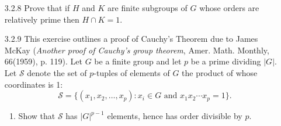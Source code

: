 \begin{enumerate}
   \item[3.2.8]   Prove that if $H$ and $K$ are finite subgroups of $G$ whose
                  orders are relatively prime then $H \cap K = 1$.
   \item[3.2.9]   This exercise outlines a proof of Cauchy's Theorem due to
                  James McKay (\textit{Another proof of Cauchy's group theorem},
                  Amer. Math. Monthly, 66(1959), p. 119). Let $G$ be a finite
                  group and let $p$ be a prime dividing $|G|$. Let $\mathcal{S}$
                  denote the set of $p$-tuples of elements of $G$ the product of
                  whose coordinates is 1:
                  $$\mathcal{S} = \{(x_1, x_2, \ldots, x_p) : x_i \in G
                    \text{ and } x_1x_2 \cdots x_p = 1\}.$$
                  \begin{enumerate}
                     \item Show that $\mathcal{S}$ has $|G|^{p-1}$ elements,
                           hence has order divisible by $p$.


\end{enumerate}
\end{enumerate}

